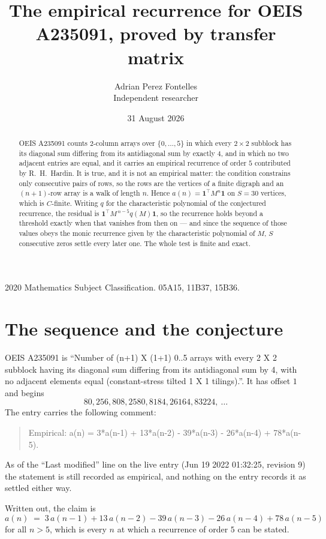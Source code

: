 \documentclass[11pt,a4paper]{article}
\title{The empirical recurrence for OEIS A235091, proved by transfer matrix}
\author{Adrian Perez Fontelles\\ \small Independent researcher}
\date{31 August 2026}
\theoremstyle{plain}
\theoremstyle{definition}
\begin{document}
\maketitle

\begin{abstract}
OEIS A235091 counts $2$-column arrays over $\{0,\dots,5\}$ in which every
$2\times2$ subblock has its diagonal sum differing from its antidiagonal sum by
exactly $4$, and in which no two adjacent entries are equal, and it
carries an empirical recurrence of order $5$ contributed by R.~H.~Hardin. It is true,
and it is not an empirical matter: the condition constrains only consecutive pairs of rows,
so the rows are the vertices of a finite digraph and an $(n+1)$-row array is a walk of
length $n$. Hence $a(n)=\mathbf{1}^{\!\top}M^{n}\mathbf{1}$ on $S=30$ vertices, which
is $C$-finite. Writing $q$ for the characteristic polynomial of the conjectured recurrence,
the residual is $\mathbf{1}^{\!\top}M^{\,n-5}q(M)\mathbf{1}$, so the recurrence
holds beyond a threshold exactly when that vanishes from then on --- and since the sequence
of those values obeys the monic recurrence given by the characteristic polynomial of $M$,
$S$ consecutive zeros settle every later one. The whole test is finite and exact.
\end{abstract}

\noindent\small 2020 Mathematics Subject Classification. 05A15, 11B37, 15B36.\normalsize

\section{The sequence and the conjecture}

OEIS A235091 is ``Number of (n+1) X (1+1) 0..5 arrays with every 2 X 2 subblock having its diagonal sum differing from its antidiagonal sum by 4, with no adjacent elements equal (constant-stress tilted 1 X 1 tilings).''. It has offset
$1$ and begins
\[
80, 256, 808, 2580, 8184, 26164, 83224,\ \dots
\]
The entry carries the following comment:
\begin{quote}\small
Empirical: a(n) = 3*a(n-1) + 13*a(n-2) - 39*a(n-3) - 26*a(n-4) + 78*a(n-5).
\end{quote}
As of the ``Last modified'' line on the live entry (Jun 19 2022 01:32:25, revision 9) the statement is
still recorded as empirical, and nothing on the entry records it as settled either way.

Written out, the claim is
\begin{equation}\label{eq:conj}
a(n)\;=\;3\,a(n-1) + 13\,a(n-2) - 39\,a(n-3) - 26\,a(n-4) + 78\,a(n-5)
\end{equation}
for all $n>5$, which is every $n$ at which a recurrence of order $5$ can be
stated.
\end{document}
